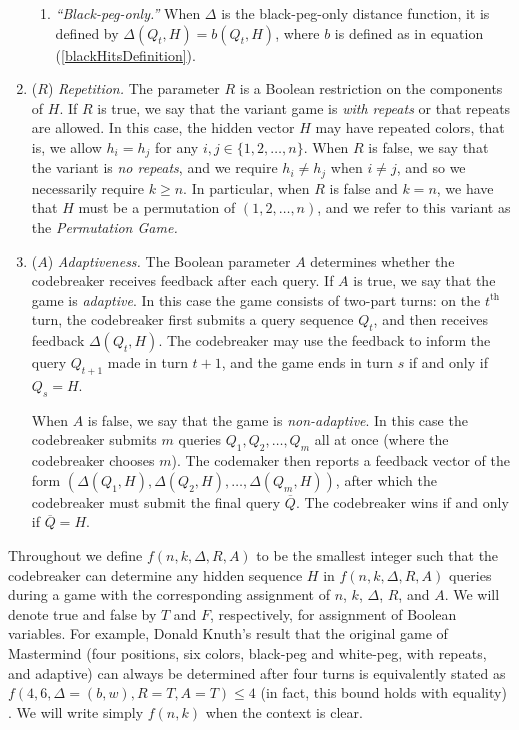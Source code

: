 \documentclass[12pt, a4paper]{article}
\newcommand{\nth}{^{\text{th}}}       %
\begin{document}
\begin{enumerate}[label=(\roman*)]
\begin{enumerate}[label=\alph*.]
		\item\textit{``Black-peg-only.''} When $\Delta$ is the black-peg-only distance function, it is defined by $\Delta(Q_t, H) = b(Q_t, H)$, where $b$ is defined as in equation (\ref{blackHitsDefinition}).
	\end{enumerate}
	
	\item($R$) \textit{Repetition.} The parameter $R$ is a Boolean restriction on the components of $H$. If $R$ is true, we say that the variant game is \textit{with repeats} or that repeats are allowed. In this case, the hidden vector $H$ may have repeated colors, that is, we allow $h_i = h_j$ for any $i,j\in\{1,2,\ldots, n\}$. When $R$ is false, we say that the variant is \textit{no repeats}, and we require $h_i\neq h_j$ when $i\neq j$, and so we necessarily require $k \geq n$. In particular, when $R$ is false and $k = n$, we have that $H$ must be a permutation of $(1, 2, \ldots, n)$, and we refer to this variant as the \textit{Permutation Game.}
	
	\item($A$) \textit{Adaptiveness.} The Boolean parameter $A$ determines whether the codebreaker receives feedback after each query. If $A$ is true, we say that the game is \textit{adaptive}. In this case the game consists of two-part turns: on the $t\nth$ turn, the codebreaker first submits a query sequence $Q_t$, and then receives feedback $\Delta(Q_t, H)$. The codebreaker may use the feedback to inform the query $Q_{t+1}$ made in turn $t+1$, and the game ends in turn $s$ if and only if $Q_s = H$.
	
	When $A$ is false, we say that the game is \textit{non-adaptive}. In this case the codebreaker submits $m$ queries $Q_1, Q_2, \ldots, Q_m$ all at once (where the codebreaker chooses $m$). The codemaker then reports a feedback vector of the form $(\Delta(Q_1, H), \Delta(Q_2, H), \ldots, \Delta(Q_m, H))$, after which the codebreaker must submit the final query $\overline{Q}$. The codebreaker wins if and only if $\overline{Q} = H$.
\end{enumerate}

Throughout we define $f(n, k, \Delta, R, A)$ to be the smallest integer such that the codebreaker can determine any hidden sequence $H$ in $f(n, k, \Delta, R, A)$ queries during a game with the corresponding assignment of $n$, $k$, $\Delta$, $R$, and $A$. We will denote true and false by $T$ and $F$, respectively, for assignment of Boolean variables. For example, Donald Knuth's result that the original game of Mastermind (four positions, six colors, black-peg and white-peg, with repeats, and adaptive) can always be determined after four turns is equivalently stated as $f(4, 6, \Delta = (b,w), R=T, A=T)\le 4$ (in fact, this bound holds with equality) \cite{DK76}. We will write simply $f(n, k)$ when the context is clear.
\end{document}
